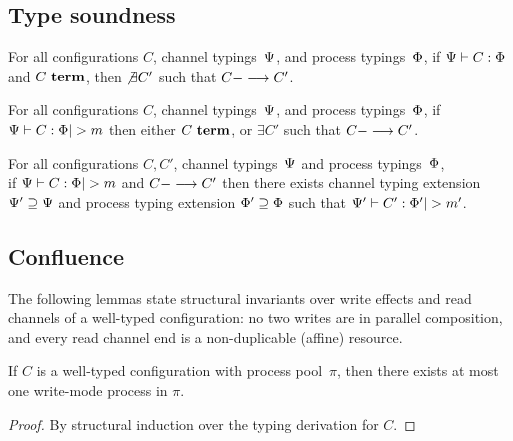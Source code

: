 \subsection{Type soundness}

\begin{lemma}
For all configurations $C$,
channel typings~$\Psi$,
and process typings~$\Phi$,
%
if $\Psi |- C : \Phi$
and $C~\textbf{term}$,
then $\not\exists C'$ such that $C ---> C'$.
\end{lemma}


\begin{theorem}[Progress]
For all configurations $C$,
channel typings~$\Psi$,
and process typings~$\Phi$,
%
if $\JCty{\StTy}{\ChTy}{C}{\PrTy} |> m$
then 
either $C~\textbf{term}$,
or $\exists C'$ such that $C ---> C'$.
\end{theorem}

\begin{theorem}[Preservation]
For all configurations $C, C'$,
channel typings~$\Psi$
and process typings~$\Phi$,
\\
%
 if $\JCty{\StTy}{\ChTy}{C}{\PrTy} |> m$
and $C ---> C'$ 
then there exists 
channel typing extension $\Psi' \supseteq \Psi$
and process typing extension $\Phi' \supseteq \Phi$
such that $\JCty{\StTy'}{\ChTy'}{C'}{\PrTy'} |> m'$.
\end{theorem}


\subsection{Confluence}

The following lemmas state structural
invariants over write effects and read channels of a well-typed
configuration: no two writes are in parallel composition, and every read channel end is a non-duplicable (affine) resource.

\begin{lemma}
\label{lem:UniqueWriter}
If $C$ is a well-typed configuration with process pool~$\pi$, 
then there exists at most one write-mode process in $\pi$.
\begin{proof}
By structural induction over the typing derivation for $C$.
\end{proof}
\end{lemma}

